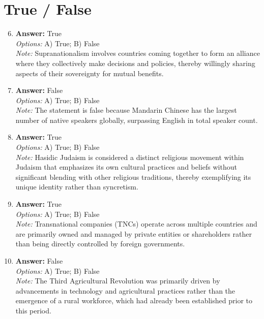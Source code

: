 \documentclass[12pt]{article}
\begin{document}
\section*{True / False}
\begin{enumerate}[label=\arabic*.]
\setcounter{enumi}{5}
\item \textbf{Answer:} True
\\ \textit{Options:} A) True; B) False
\\ \textit{Note:} Supranationalism involves countries coming together to form an alliance where they collectively make decisions and policies, thereby willingly sharing aspects of their sovereignty for mutual benefits.
\item \textbf{Answer:} False
\\ \textit{Options:} A) True; B) False
\\ \textit{Note:} The statement is false because Mandarin Chinese has the largest number of native speakers globally, surpassing English in total speaker count.
\item \textbf{Answer:} True
\\ \textit{Options:} A) True; B) False
\\ \textit{Note:} Hasidic Judaism is considered a distinct religious movement within Judaism that emphasizes its own cultural practices and beliefs without significant blending with other religious traditions, thereby exemplifying its unique identity rather than syncretism.
\item \textbf{Answer:} True
\\ \textit{Options:} A) True; B) False
\\ \textit{Note:} Transnational companies (TNCs) operate across multiple countries and are primarily owned and managed by private entities or shareholders rather than being directly controlled by foreign governments.
\item \textbf{Answer:} False
\\ \textit{Options:} A) True; B) False
\\ \textit{Note:} The Third Agricultural Revolution was primarily driven by advancements in technology and agricultural practices rather than the emergence of a rural workforce, which had already been established prior to this period.
\end{enumerate}
\end{document}
